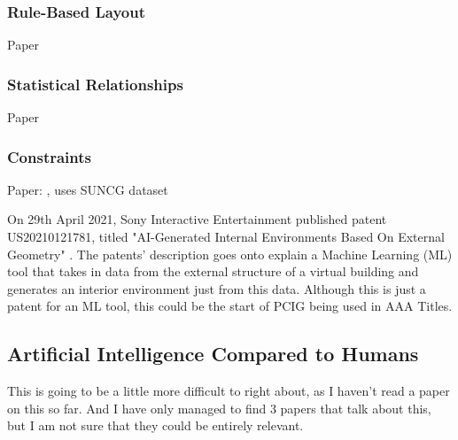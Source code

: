 \subsubsection*{Rule-Based Layout}
Paper \cite{rule-based-layout}
\subsubsection*{Statistical Relationships}
Paper \cite{make-it-home}
\subsubsection*{Constraints}
Paper: \cite{constrained-layouts}, uses SUNCG dataset \cite{suncg}

\bigskip
On 29th April 2021, Sony Interactive Entertainment published patent US20210121781, 
titled "AI-Generated Internal Environments Based On External Geometry" \cite{sony-patent}.
The patents' description goes onto explain a 
Machine Learning (ML) tool that takes in data from the external structure of a virtual building
and generates an interior environment just from this data.
Although this is just a patent for an ML tool, this could be the start of PCIG being used in AAA Titles. 

\subsection{Artificial Intelligence Compared to Humans}
This is going to be a little more difficult to right about, as I haven't read a paper on this so far.
And I have only managed to find 3 papers that talk about this, but I am not sure that they could be entirely relevant.